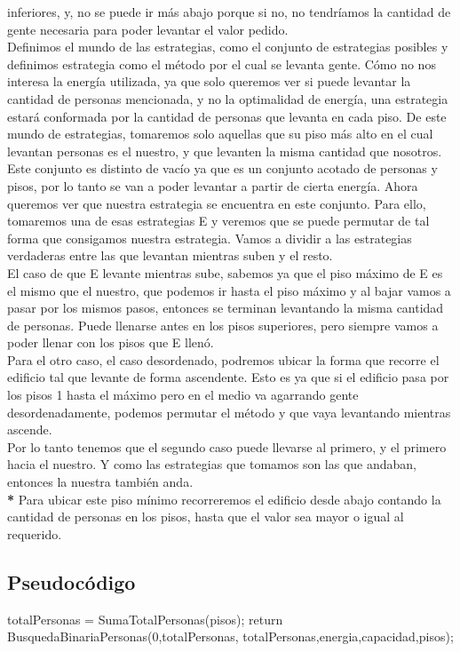 inferiores, y, no se puede ir más abajo porque si no, no tendríamos la cantidad de gente necesaria para poder levantar el valor pedido.\\
Definimos el mundo de las estrategias, como el conjunto de estrategias posibles y definimos estrategia como el método por el cual se levanta gente. Cómo no nos interesa
la energía utilizada, ya que solo queremos ver si puede levantar la cantidad de personas mencionada, y no la optimalidad de energía, una estrategia estará conformada por la cantidad
de personas que levanta en cada piso. De este mundo de estrategias, tomaremos solo aquellas que su piso más alto en el cual levantan personas es el nuestro, y que
levanten la misma cantidad que nosotros. Este conjunto es distinto de vacío ya que es un conjunto acotado de personas y pisos, por lo tanto se van a poder levantar a partir de
cierta energía. Ahora queremos ver que nuestra estrategia se encuentra en este conjunto. Para ello, tomaremos una de esas estrategias E y veremos que se puede permutar de tal
forma que consigamos nuestra estrategia. Vamos a dividir a las estrategias verdaderas entre las que levantan mientras suben y el resto.\\
El caso de que E levante mientras sube, sabemos ya que el piso máximo de E es el mismo que 
el nuestro, que podemos ir hasta el piso máximo y al bajar vamos a pasar por los mismos pasos, entonces se terminan levantando la misma cantidad de personas. Puede llenarse antes en los pisos superiores, pero siempre vamos a poder
llenar con los pisos que E llenó.\\
Para el otro caso, el caso desordenado, podremos ubicar la forma que recorre el edificio tal que levante de forma ascendente. Esto es ya que si el edificio pasa por los pisos 1 hasta el máximo pero en el medio va agarrando gente
desordenadamente, podemos permutar el método y que vaya levantando mientras ascende. \\
Por lo tanto tenemos que el segundo caso puede llevarse al primero, y el primero hacia el nuestro. Y como las estrategias que tomamos son las que andaban, entonces la nuestra también anda.\\

{\footnotesize {\textbf{*} Para ubicar este piso mínimo recorreremos el edificio desde abajo contando la cantidad de personas en los pisos, hasta que el valor sea mayor o igual al requerido.}}

\subsection{Pseudoc\'odigo}
\begin{codebox}
\li		totalPersonas = SumaTotalPersonas(pisos);
\li		return BusquedaBinariaPersonas(0,totalPersonas, totalPersonas,energia,capacidad,pisos);
\end{codebox}

